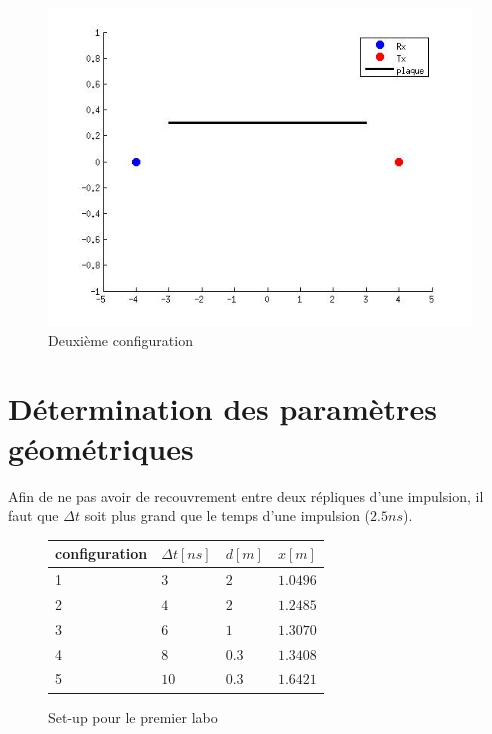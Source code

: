 \documentclass[10pt,a4paper]{article}
\begin{document}
	\begin{figure}[h]
	\centering
	\includegraphics[scale=0.4]{conf2.jpg}
	\caption{Deuxième configuration \label{conf2}}
	\end{figure}		
	
	
	\section{Détermination des paramètres géométriques}
		Afin de ne pas avoir de recouvrement entre deux répliques d'une impulsion, il faut que $\Delta t$ soit plus grand que le temps d'une impulsion ($2.5ns$).
		
		
		\begin{figure}[h]
		\centering
		\begin{tabular}{|l|l|l|l|}
		\hline
		 configuration & $\Delta t [ns]$ & $d [m]$ & $x [m]$ \\
		 \hline
		 1 & $3$ & $2$ & $1.0496$ \\
		 2 & $4$ & $2$ & $1.2485$ \\
		 3 & $6$ & $1$ & $1.3070$ \\
		 4 & $8$ & $0.3$ & $1.3408$ \\
		 5 & $10$ & $0.3$ & $1.6421$ \\
		 \hline
		\end{tabular}
		
		\caption{Set-up pour le premier labo}
		\end{figure}
\end{document}
